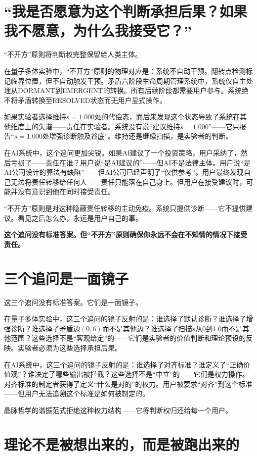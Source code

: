\documentclass[11pt,a4paper]{book}
\theoremstyle{definition}
\begin{document}
\section*{“我是否愿意为这个判断承担后果？如果我不愿意，为什么我接受它？”}

“不开方”原则将判断权完整保留给人类主体。

在量子多体实验中，“不开方”原则的物理对应是：系统不自动干预。翻转点检测标记临界位置，但不自动触发干预。矛盾六阶段生命周期管理系统中，系统仅自主处理从DORMANT到EMERGENT的转换。所有后续阶段都需要用户参与。系统绝不将矛盾转换至RESOLVED状态而无用户显式操作。

如果实验者选择维持$s=1.000$处的代偿态，而后来发现这个状态导致了系统在其他维度上的失谐——责任在实验者。系统没有说“建议维持$s=1.000$”——它只报告“$s=1.000$处增强诊断触及谷底”。维持还是继续扫描，是实验者的判断。

在AI系统中，这个追问更加尖锐。如果AI建议了一个投资策略，用户采纳了，然后亏损了——责任在谁？用户说“是AI建议的”——但AI不是法律主体。用户说“是AI公司设计的算法有缺陷”——但AI公司已经声明了“仅供参考”。用户最终发现自己无法将责任转移给任何人——责任只能落在自己身上。但用户在接受建议时，可能并没有意识到他在同时接受责任。

“不开方”原则是对这种隐蔽责任转移的主动免疫。系统只提供诊断——它不提供建议。看见之后怎么办，永远是用户自己的事。

\textbf{这个追问没有标准答案。但“不开方”原则确保你永远不会在不知情的情况下接受责任。}

\section*{三个追问是一面镜子}

这三个追问没有标准答案。它们是一面镜子。

在量子多体实验中，这三个追问的镜子反射的是：谁选择了默认诊断？谁选择了增强诊断？谁选择了矛盾边$(0,6)$而不是其他边？谁选择了扫描$s$从0到1.0而不是其他范围？这些选择不是“客观给定”的——它们是实验者的价值判断和理论预设的反映。实验者必须为这些选择承担后果。

在AI系统中，这三个追问的镜子反射的是：谁选择了对齐标准？谁定义了“正确价值观”？谁决定了哪些输出被拦截？这些选择不是“中立”的——它们是权力操作。对齐标准的制定者获得了定义“什么是对的”的权力。用户被要求“对齐”到这个标准——但用户无法追溯这个标准是如何被制定的。

晶脉哲学的谐振范式拒绝这种权力结构——它将判断权归还给每一个用户。

\section*{理论不是被想出来的，而是被跑出来的}
\end{document}
